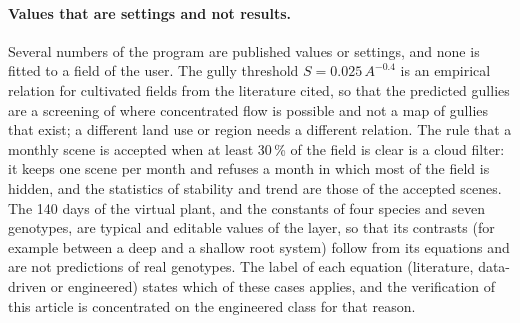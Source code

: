 \documentclass[preprint,12pt]{elsarticle}
\begin{document}
\paragraph{Values that are settings and not results.} Several numbers of the program are published values or settings, and none is fitted to a field of the user. The gully threshold $S=0.025\,A^{-0.4}$ is an empirical relation for cultivated fields from the literature cited, so that the predicted gullies are a screening of where concentrated flow is possible and not a map of gullies that exist; a different land use or region needs a different relation. The rule that a monthly scene is accepted when at least 30\,\% of the field is clear is a cloud filter: it keeps one scene per month and refuses a month in which most of the field is hidden, and the statistics of stability and trend are those of the accepted scenes. The 140 days of the virtual plant, and the constants of four species and seven genotypes, are typical and editable values of the layer, so that its contrasts (for example between a deep and a shallow root system) follow from its equations and are not predictions of real genotypes. The label of each equation (literature, data-driven or engineered) states which of these cases applies, and the verification of this article is concentrated on the engineered class for that reason.
\end{document}
